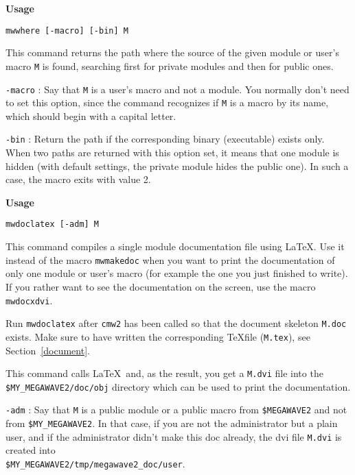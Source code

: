 {\Large\bf Usage} \bigskip

\verb+mwwhere [-macro] [-bin] M+

\Next

\Description
This command returns the path where the source of the given module or user's macro 
\verb+M+ is found, searching first for private modules and then for public ones.

\Next

\Options

\verb+-macro+ : Say that  \verb+M+ is a user's macro and not a module.
You normally don't need to set this option, since the command recognizes if 
\verb+M+ is a macro by its name, which should begin with a capital letter. 

\verb+-bin+ : Return the path if the corresponding binary (executable) exists
only. When two paths are returned with this option set, it means that one module
is hidden (with default settings, the private module hides the public one).
In such a case, the macro exits with value 2.
        
\newpage

{\Large\bf Usage} \bigskip

\verb+mwdoclatex [-adm] M+

\Next

\Description
This command compiles a single module documentation file using \LaTeX.
Use it instead of the macro \verb+mwmakedoc+ when you want to print 
the documentation of only one module or user's macro (for example the one you just
finished to write).
If you rather want to see the documentation on the screen, use the
macro \verb+mwdocxdvi+.

Run \verb+mwdoclatex+ after \verb+cmw2+ has been called so that the document 
skeleton \verb+M.doc+ exists.
Make sure to have written the corresponding \TeX file (\verb+M.tex+), see Section~\ref{document}.

This command calls \LaTeX\ and, as the result, you get a \verb+M.dvi+ file
into the \verb+$MY_MEGAWAVE2/doc/obj+ directory which can be used to print the 
documentation.

\Next

\Options

\verb+-adm+ : Say that \verb+M+ is a public module or a public macro
from \verb+$MEGAWAVE2+ and not from \verb+$MY_MEGAWAVE2+.
In that case, if you are not the administrator but a plain user, and if the
administrator didn't make this doc already, the dvi file \verb+M.dvi+ is created into \\
\verb+$MY_MEGAWAVE2/tmp/megawave2_doc/user+.

